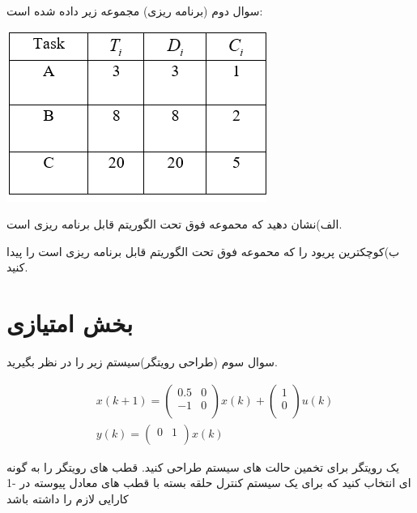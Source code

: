 \documentclass[12pt]{article}
\begin{document}
    \begin{problem}{سوال دوم}
    	(برنامه ریزی) مجموعه 
    	زیر داده شده است:
    	
    	\centering
    	\includegraphics[scale=1]{Resources/2.png}
    	
    	\raggedright
    	الف)نشان دهید که محموعه 
    	فوق تحت الگوریتم
    	قابل برنامه ریزی است.
    	
    	ب)کوچکترین پریود 
    	را که محموعه 
    	فوق تحت الگوریتم 
    	قابل برنامه ریزی است را پیدا کنید. 
    
    \end{problem}
    \section{بخش امتیازی}
    \begin{problem}{سوال سوم}
    	(طراحی رویتگر)سیستم زیر را در نظر بگیرید.
    	
    	
    	\begin{align}
    		& x(k+1)=\left( \begin{matrix}
    			0.5 & 0  \\
    			-1 & 0  \\
    		\end{matrix} \nonumber \right)x(k)+\left( \begin{matrix}
    			1  \\
    			0  \\
    		\end{matrix} \nonumber \right)u(k) \\ 
    		& y(k)=\left( \begin{matrix}
    			0 & 1  \\
    		\end{matrix} \right)x(k) \nonumber
    	\end{align}
    	
    	یک رویتگر برای تخمین حالت های سیستم طراحی کنید. قطب های رویتگر را به گونه ای انتخاب کنید که برای یک سیستم کنترل حلقه بسته با قطب های معادل پیوسته در -1 کارایی لازم را داشته باشد
    	
    \end{problem}
    
\end{document}
